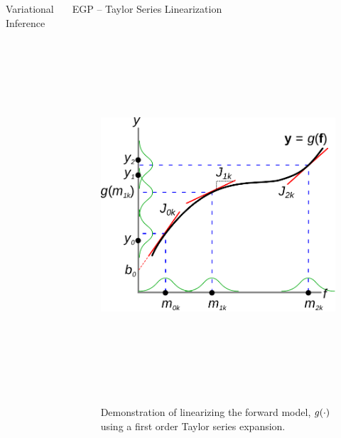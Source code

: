 \documentclass[final]{beamer}
\newlength{\onecolwid}
\newlength{\twocolwid}
\begin{document}
\begin{frame}[t]
\begin{columns}[t]
\begin{column}{\twocolwid}
\begin{columns}[t,totalwidth=\twocolwid]
\begin{column}{\onecolwid}
\begin{block}{Variational Inference}
\end{block}


\end{column} %

\begin{column}{\onecolwid}\vspace{-.6in} %


\begin{block}{EGP -- Taylor Series Linearization}
    
\begin{figure}
    \includegraphics[height=14cm]{fig/taylor_gp}
    \hspace{3cm}
    \caption{Demonstration of linearizing the forward model, $g\!\left({{\cdot}}\right)$
        using a first order Taylor series expansion.}
\end{figure}        


\end{block}
\end{column}
\end{columns}
\end{column}
\end{columns}
\end{frame}
\end{document}
